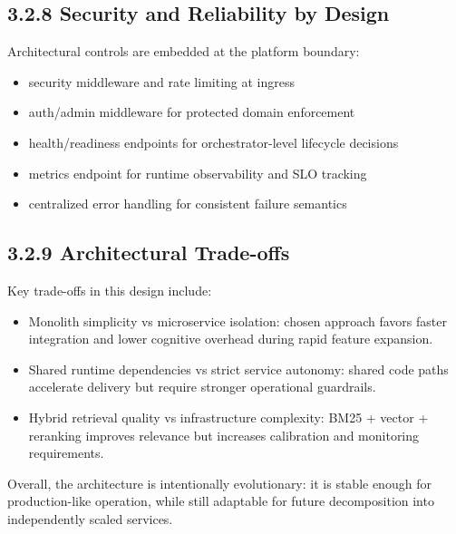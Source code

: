 \documentclass[12pt,a4paper]{report}
\begin{document}
\subsection{3.2.8 Security and Reliability by Design}
Architectural controls are embedded at the platform boundary:
\begin{itemize}
\item security middleware and rate limiting at ingress
\item auth/admin middleware for protected domain enforcement
\item health/readiness endpoints for orchestrator-level lifecycle decisions
\item metrics endpoint for runtime observability and SLO tracking
\item centralized error handling for consistent failure semantics
\end{itemize}

\subsection{3.2.9 Architectural Trade-offs}
Key trade-offs in this design include:
\begin{itemize}
\item Monolith simplicity vs microservice isolation: chosen approach favors faster integration and lower cognitive overhead during rapid feature expansion.
\item Shared runtime dependencies vs strict service autonomy: shared code paths accelerate delivery but require stronger operational guardrails.
\item Hybrid retrieval quality vs infrastructure complexity: BM25 + vector + reranking improves relevance but increases calibration and monitoring requirements.
\end{itemize}

Overall, the architecture is intentionally evolutionary: it is stable enough for production-like operation, while still adaptable for future decomposition into independently scaled services.
\end{document}
